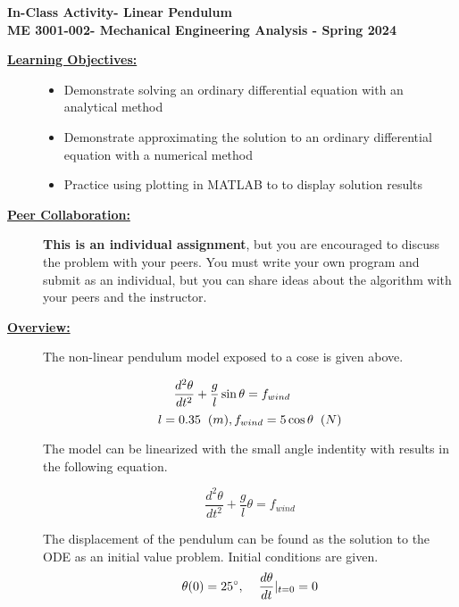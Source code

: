 \documentclass[12pt]{article}
\newcommand{\COURNAME}{ME 3001-002}
\newcommand{\CURRTERM}{Spring 2024} %
\newcommand{\ANUM}{7} %
\newcommand{\activitytitle}{Linear Pendulum} %
\begin{document}
\thispagestyle{plain}

\begin{center}
   {\bf \Large In-Class Activity\hspc\ANUM\hspc - \activitytitle}\vspace{3mm}\\
   {\bf \large \COURNAME - Mechanical Engineering Analysis - \CURRTERM} \vspace{5mm}\\
\end{center}

\begin{description}


\item[\textbf{\underline{Learning Objectives:}}] \hfill \vspace{0mm}

\begin{itemize}
	\item Demonstrate solving an ordinary differential equation with an analytical method
	\item Demonstrate approximating the solution to an ordinary differential equation with a numerical method
	\item Practice using plotting in MATLAB to to display solution results
\end{itemize}

\item[\textbf{\underline{Peer Collaboration:}}] \hfill \vspace{0mm}
	
	{\bf This is an individual assignment}, but you are encouraged to discuss the problem with your peers. You must write your own program and submit as an individual, but you can share ideas about the algorithm with your peers and the instructor.

\item[\textbf{\underline{Overview:}}] \hfill \vspace{0mm}


	The non-linear pendulum model exposed to a cose is given above. 	

   \[\frac{d^2\theta}{dt^2}+\frac{g}{l}\sin{\theta}=f_{wind}\hspace{10mm} \] 
	\[ l=0.35 \hspace{2mm}(m), f_{wind} = 5 \cos{\theta} \hspace{2mm}(N) \]

	The model can be linearized with the small angle indentity with results in the following equation.
 	
 	\[ \frac{d^2\theta}{dt^2}+\frac{g}{l}\theta=f_{wind} \]

 	The displacement of the pendulum can be found as the solution to the ODE as an initial value problem. Initial conditions are given.
 	\[ \theta(0)=25^\circ, \hspace{4mm}\frac{d\theta}{dt}|_{t=0}=0 \]




\end{description}
\end{document}
